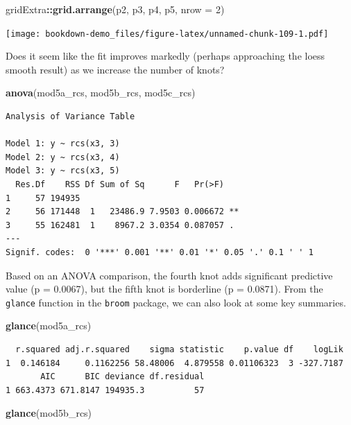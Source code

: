\documentclass[]{book}
\newenvironment{Shaded}{\begin{snugshade}}{\end{snugshade}}
\newcommand{\KeywordTok}[1]{\textcolor[rgb]{0.13,0.29,0.53}{\textbf{#1}}}
\newcommand{\DataTypeTok}[1]{\textcolor[rgb]{0.13,0.29,0.53}{#1}}
\newcommand{\DecValTok}[1]{\textcolor[rgb]{0.00,0.00,0.81}{#1}}
\newcommand{\OperatorTok}[1]{\textcolor[rgb]{0.81,0.36,0.00}{\textbf{#1}}}
\newcommand{\NormalTok}[1]{#1}
\theoremstyle{definition}
\theoremstyle{definition}
\theoremstyle{definition}
\theoremstyle{remark}
\begin{document}
\begin{Shaded}
\begin{Highlighting}[]
\NormalTok{gridExtra}\OperatorTok{::}\KeywordTok{grid.arrange}\NormalTok{(p2, p3, p4, p5, }\DataTypeTok{nrow =} \DecValTok{2}\NormalTok{)}
\end{Highlighting}
\end{Shaded}

\texttt{[image: bookdown-demo\_files/figure-latex/unnamed-chunk-109-1.pdf]}

Does it seem like the fit improves markedly (perhaps approaching the
loess smooth result) as we increase the number of knots?

\begin{Shaded}
\begin{Highlighting}[]
\KeywordTok{anova}\NormalTok{(mod5a_rcs, mod5b_rcs, mod5c_rcs)}
\end{Highlighting}
\end{Shaded}

\begin{verbatim}
Analysis of Variance Table

Model 1: y ~ rcs(x3, 3)
Model 2: y ~ rcs(x3, 4)
Model 3: y ~ rcs(x3, 5)
  Res.Df    RSS Df Sum of Sq      F   Pr(>F)   
1     57 194935                                
2     56 171448  1   23486.9 7.9503 0.006672 **
3     55 162481  1    8967.2 3.0354 0.087057 . 
---
Signif. codes:  0 '***' 0.001 '**' 0.01 '*' 0.05 '.' 0.1 ' ' 1
\end{verbatim}

Based on an ANOVA comparison, the fourth knot adds significant
predictive value (p = 0.0067), but the fifth knot is borderline (p =
0.0871). From the \texttt{glance} function in the \texttt{broom}
package, we can also look at some key summaries.

\begin{Shaded}
\begin{Highlighting}[]
\KeywordTok{glance}\NormalTok{(mod5a_rcs)}
\end{Highlighting}
\end{Shaded}

\begin{verbatim}
  r.squared adj.r.squared    sigma statistic    p.value df    logLik
1  0.146184     0.1162256 58.48006  4.879558 0.01106323  3 -327.7187
       AIC      BIC deviance df.residual
1 663.4373 671.8147 194935.3          57
\end{verbatim}

\begin{Shaded}
\begin{Highlighting}[]
\KeywordTok{glance}\NormalTok{(mod5b_rcs)}
\end{Highlighting}
\end{Shaded}
\end{document}
